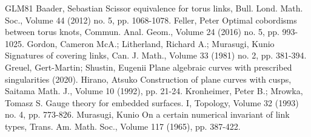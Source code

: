 \documentclass[10pt,a4paper]{article}
\theoremstyle{definition}
\numberwithin{equation}{section}
\begin{document}
\begin{thebibliography}{GLM81}
 Baader, Sebastian Scissor equivalence for torus links, Bull. Lond. Math. Soc., Volume 44 (2012) no. 5, pp. 1068-1078.
 Feller, Peter Optimal cobordisms between torus knots, Commun. Anal. Geom., Volume 24 (2016) no. 5, pp. 993-1025.
 Gordon, Cameron McA.; Litherland, Richard A.; Murasugi, Kunio Signatures of covering links, Can. J. Math., Volume 33 (1981) no. 2, pp. 381-394.
 Greuel, Gert-Martin; Shustin, Eugenii Plane algebraic curves with prescribed singularities (2020).
 Hirano, Atsuko Construction of plane curves with cusps, Saitama Math. J., Volume 10 (1992), pp. 21-24.
 Kronheimer, Peter B.; Mrowka, Tomasz S. Gauge theory for embedded surfaces. I, Topology, Volume 32 (1993) no. 4, pp. 773-826.
 Murasugi, Kunio On a certain numerical invariant of link types, Trans. Am. Math. Soc., Volume 117 (1965), pp. 387-422.
\end{thebibliography}
\end{document}
